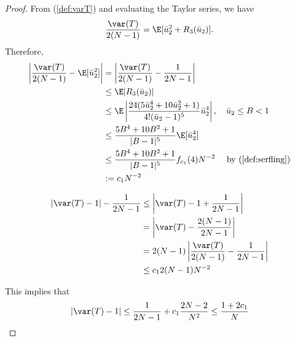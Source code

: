 \begin{proof}
  From (\ref{def:varT}) and evaluating the Taylor series, we have 
  \begin{equation*}
    \frac{\var(T)}{2(N-1)} = \E[\bar{u}_2^2 + R_3(\bar{u}_2)].
  \end{equation*}
  Therefore,
  \begin{align*}
    \left | \frac{\var(T)}{2(N-1)} - \E[\bar{u}_2^2] \right | 
    &= \left | \frac{\var(T)}{2(N-1)} - \frac{1}{2N-1} \right | \\
    &\leq  \E |R_3(\bar{u}_2)| \\
    &\leq \E \left | \frac{24(5\bar{u}_2^4 + 10  \bar{u}_2^2 +
        1)}{4!(\bar{u}_2-1)^5}\bar{u}_2^4  \right |, \quad
    \bar{u}_2 \leq B < 1 \\
    &\leq \frac{5B^4+10B^2+1}{|B-1|^5} \E [\bar{u}_2^4] \\
    &\leq \frac{5B^4+10B^2+1}{|B-1|^5} f_{c_1}(4) N^{-2} \quad \text{
      by } (\ref{def:serfling}) \\
    &:= c_1 N^{-2}
  \end{align*}
  
  \begin{align*}
    |\var(T) - 1| - \frac{1}{2N-1} 
    &\leq \left | \var(T) - 1 + \frac{1}{2N-1} \right | \\
    &= \left | \var(T) - \frac{2(N-1)}{2N-1} \right | \\
    &= 2(N-1) \left | \frac{\var(T)}{2(N-1)} - \frac{1}{2N-1} \right | \\
    &\leq c_1 2(N-1)N^{-2}
  \end{align*}
  
  This implies that 
  \begin{equation*}
    |\var(T) - 1| \leq \frac{1}{2N-1} + c_1 \frac{2N-2}{N^2} \leq
    \frac{1 + 2c_1}{N}
  \end{equation*}
\end{proof}

